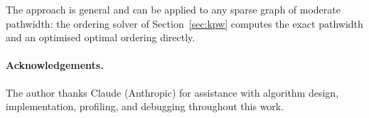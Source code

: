 \documentclass[12pt]{article}
\theoremstyle{definition}
\begin{document}
The approach is general and can be applied to any sparse graph of moderate
pathwidth: the ordering solver of Section~\ref{sec:kpw} computes the exact
pathwidth and an optimised optimal ordering directly.

\paragraph{Acknowledgements.}
The author thanks Claude (Anthropic) for assistance with algorithm design,
implementation, profiling, and debugging throughout this work.

\nocite{Minato1993,Kinnersley,Bellman,HeldKarp}


\end{document}
